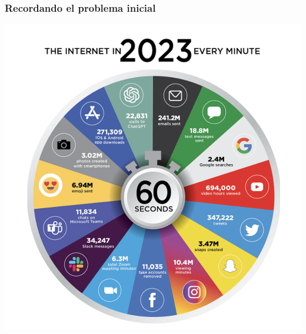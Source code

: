 \documentclass[
10pt, %
aspectratio=169, %
]{beamer}
\begin{document}
	\begin{frame}
		
		\frametitle{Recordando el problema inicial}
		
		\centering
		\includegraphics[scale=0.33]{infografia.png}
		
		
		
	\end{frame}		
	
\end{document}
